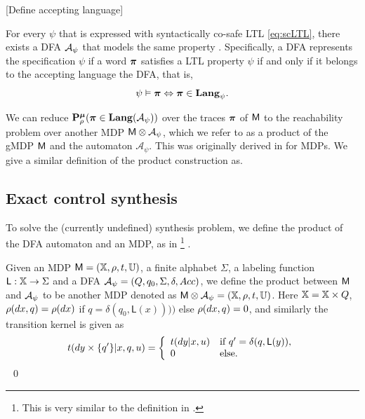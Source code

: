 \documentclass{ifacconf}
\newcommand{\red}[1]{{\color{red} #1}}
\begin{document}
\red{[Define accepting language]}






For every $\psi$ that is expressed with syntactically co-safe LTL  \eqref{eq:scLTL}, there exists a DFA  $\mathcal{A}_\psi$ that models the same property \citep{Belta2017}. Specifically, a DFA represents the specification $\psi$ if a word ${\boldsymbol{\pi}}$ satisfies a LTL property $\psi$ if and only if it belongs to the accepting language the DFA, that is,
	 \[\psi\vDash{\boldsymbol{\pi}} \Leftrightarrow {\boldsymbol{\pi}}\in \mathbf{Lang}_\psi.\]

We can
reduce $\mathbf{P}_\rho^{\boldsymbol{\mu}}
({\boldsymbol{\pi}} \in\mathbf{Lang} (\mathcal A_\psi))$  over the traces ${\boldsymbol{\pi}}$ of $\mathsf{M}$ to the reachability problem
 over another MDP   $\mathsf{M}\otimes\mathcal A_\psi$, which we refer to as a product of the gMDP $\mathsf{M}$ and the automaton $\mathcal A_\psi$. This was originally derived in \citep{tmka2013} for MDPs. We give a similar definition of the product construction as.

\subsection{Exact control synthesis}


To solve the \red{(currently undefined)} synthesis problem, we define the product of the DFA automaton and an MDP, 
as in \citep{tech_report_TACAS}\footnote{\red{This is very similar to the definition in \citep{tmka2013}. }} .
\begin{definition}
\label{def:product}
Given an MDP  $\mathsf{M} = ({\mathbb{X}}, \rho, t, {\mathbb{U}})$,
a finite alphabet $\Sigma$,
a labeling function $\mathsf{L}:{\mathbb{X}}\rightarrow\Sigma$
and a DFA  $\mathcal{A}_\psi = (Q, q_0, \Sigma, \delta, Acc)$,
we define the product between $\mathsf{M}$ and $\mathcal{A}_\psi$ to be another MDP denoted as
$\mathsf{M}\otimes\mathcal{A}_\psi = (\relax {\mathbb{X}}, \relax\rho,\relax{t},{\mathbb{U}})$.
Here $\relax {\mathbb{X}}= {\mathbb{X}}\times Q$, $\relax\rho(dx,q) = \rho(dx)$ if $q= \delta(q_0,\mathsf L(x))))$ else $ \relax\rho(dx,q) =0$, and similarly the transition kernel is given as
\begin{equation*}
  \relax{t}(d y\times\{q'\}|x,q,u) =  \left\{\begin{array}{ll}t(dy|x,u)& \text{if } q' =\delta(q,\mathsf{L}(y)),\\ 0 & \text{else.}  \end{array}\right.
\end{equation*} 
\hfill \mbox{ }\qed
\end{definition}
\end{document}
